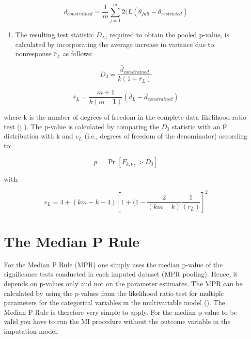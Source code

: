 \documentclass[
]{book}
\providecommand{\tightlist}{%
  \setlength{\itemsep}{0pt}\setlength{\parskip}{0pt}}
\begin{document}
\[\bar d_{constrained} = \frac{1}{m} \sum_{j=1}^m 2(L(\bar\theta_{full} - \bar\theta_{restricted})\]

\begin{enumerate}
\def\labelenumi{\arabic{enumi}.}
\setcounter{enumi}{4}
\tightlist
\item
  The resulting test statistic \(D_L\), required to obtain the pooled p-value, is calculated by incorporating the average increase in variance due to nonresponse \(\bar r_L\) as follows:
\end{enumerate}

\[D_3 = \frac{\bar d_{constrained}}{k(1+\bar r_L)}\]

\[\bar r_L = \frac{m+1}{k(m-1)}(\bar d_L-\bar d_{constrained})\]

where k is the number of degrees of freedom in the complete data likelihood ratio test (\citet{Mistler2013}; \citet{VanBuuren2018}). The p-value is calculated by comparing the \(D_3\) statistic with an F distribution with k and \(v_L\) (i.e., degrees of freedom of the denominator) according to:

\[p = \Pr[F_{k,\nu_L}>D_3]\]

with:

\[v_L = 4 + (km-k-4)[1+(1-\frac{2}{(km-k)}\frac{1}{(r_L)}]^2\]

\hypertarget{the-median-p-rule}{%
\section{The Median P Rule}\label{the-median-p-rule}}

For the Median P Rule (MPR) one simply uses the median p-value of the significance tests conducted in each imputed dataset (MPR pooling). Hence, it depends on p-values only and not on the parameter estimates. The MPR can be calculated by using the p-values from the likelihood ratio test for multiple parameters for the categorical variables in the multivariable model (\citet{Eekhout2017}). The Median P Rule is therefore very simple to apply. For the median p-value to be valid you have to run the MI procedure without the outcome variable in the imputation model.

  
\end{document}

